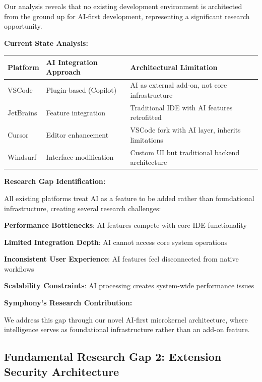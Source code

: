 Our analysis reveals that no existing development environment is architected from the ground up for AI-first development, representing a significant research opportunity.

\textbf{Current State Analysis:}

\begin{center}
\begin{tabular}{@{}p{3cm}p{4cm}p{5cm}@{}}
\toprule
\textbf{Platform} & \textbf{AI Integration Approach} & \textbf{Architectural Limitation} \\
\midrule
VSCode & Plugin-based (Copilot) & AI as external add-on, not core infrastructure \\
JetBrains & Feature integration & Traditional IDE with AI features retrofitted \\
Cursor & Editor enhancement & VSCode fork with AI layer, inherits limitations \\
Windsurf & Interface modification & Custom UI but traditional backend architecture \\
\bottomrule
\end{tabular}
\label{tab:ai-integration-gaps}
\end{center}

\textbf{Research Gap Identification:}

All existing platforms treat AI as a feature to be added rather than foundational infrastructure, creating several research challenges:

\begin{compactlist}
    \item \textbf{Performance Bottlenecks}: AI features compete with core IDE functionality
    \item \textbf{Limited Integration Depth}: AI cannot access core system operations
    \item \textbf{Inconsistent User Experience}: AI features feel disconnected from native workflows
    \item \textbf{Scalability Constraints}: AI processing creates system-wide performance issues
\end{compactlist}

\textbf{Symphony's Research Contribution:}

We address this gap through our novel AI-first microkernel architecture, where intelligence serves as foundational infrastructure rather than an add-on feature.

\subsection{Fundamental Research Gap 2: Extension Security Architecture}
\label{subsec:security-gap}

